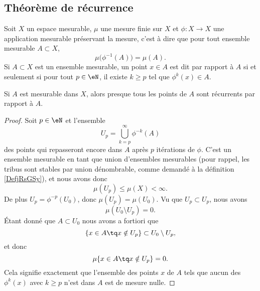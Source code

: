 \subsection{Théorème de récurrence}

Soit \( X\) un espace mesurable, \( \mu\) une mesure finie sur \( X\) et \( \phi\colon X\to X\) une application mesurable préservant la mesure, c'est à dire que pour tout ensemble mesurable \( A\subset X\),
\begin{equation}
    \mu\big( \phi^{-1}(A) \big)=\mu(A).
\end{equation}
Si \( A\subset X\) est un ensemble mesurable, un point \( x\in A\) est dit  par rapport à \( A\) si et seulement si pour tout \( p\in \eN\), il existe \( k\geq p\) tel que \( \phi^k(x)\in A\).

\begin{theorem}     \label{ThoYnLNEL}
    Si \( A\) est mesurable dans \( X\), alors presque tous les points de \( A\) sont récurrents par rapport à \( A\).
\end{theorem}

\begin{proof}
    Soit \( p\in \eN\) et l'ensemble
    \begin{equation}
        U_p=\bigcup_{k=p}^{\infty}\phi^{-k}(A)
    \end{equation}
    des points qui repasseront encore dans \( A\) après \( p\) itérations  de \( \phi\). C'est un ensemble mesurable en tant que union d'ensembles mesurables (pour rappel, les tribus sont stables par union dénombrable, comme demandé à la définition \ref{DefjRsGSy}), et nous avons donc
    \begin{equation}
        \mu(U_p)\leq \mu(X)<\infty.
    \end{equation}
    De plus \( U_p=\phi^{-p}(U_0)\), donc \( \mu(U_p)=\mu(U_0)\). Vu que \( U_p\subset U_p\), nous avons
    \begin{equation}
        \mu(U_0\setminus U_p)=0.
    \end{equation}
    Étant donné que \( A\subset U_0\) nous avons a fortiori que
    \begin{equation}
        \{ x\in A\tq x\notin U_p \}\subset U_0\setminus U_p,
    \end{equation}
    et donc
    \begin{equation}
        \mu\{ x\in A\tq x\notin U_p \}=0.
    \end{equation}
    Cela signifie exactement que l'ensemble des points \( x\) de \( A\) tels que aucun des \( \phi^k(x)\) avec \( k\geq p\) n'est dans \( A\) est de mesure nulle.
\end{proof}

